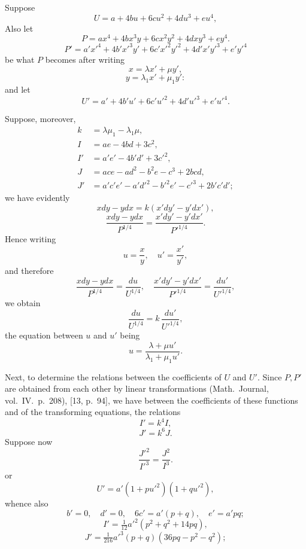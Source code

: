 \documentclass[11pt]{article}
\begin{document}
Suppose
\[
U = a + 4bu + 6cu^2 + 4du^3 + eu^4,
\]
Also let
\[
P = ax^4 + 4bx^3 y + 6cx^2 y^2 + 4dxy^3 + ey^4.
\]
\[
P' = a'x'^4 + 4b'x'^3 y' + 6c'x'^2 y'^2 + 4d'x'y'^3 + e'y'^4
\]
be what $P$ becomes after writing
\[
x = \lambda x' + \mu y',
\]
\[
y = \lambda_1 x' + \mu_1 y':
\]
and let
\[
U' = a' + 4b'u' + 6c'u'^2 + 4d'u'^3 + e'u'^4.
\]

\newpage
\setcounter{page}{225}

Suppose, moreover,
\begin{align*}
k &= \lambda\mu_1 - \lambda_1\mu,\\
I &= ae - 4bd + 3c^2,\\
I' &= a'e' - 4b'd' + 3c'^2,\\
J &= ace - ad^2 - b^2 e - c^3 + 2bcd,\\
J' &= a'c'e' - a'd'^2 - b'^2 e' - c'^3 + 2b'c'd';
\end{align*}
we have evidently
\[
xdy - ydx = k(x'dy' - y'dx'),
\]
\[
\frac{xdy - ydx}{P^{1/4}} = \frac{x'dy' - y'dx'}{P'^{1/4}}.
\]
Hence writing
\[
u = \frac{x}{y},\quad u' = \frac{x'}{y'},
\]
and therefore
\[
\frac{xdy - ydx}{P^{1/4}} = \frac{du}{U^{1/4}},\quad \frac{x'dy' - y'dx'}{P'^{1/4}} = \frac{du'}{U'^{1/4}},
\]
we obtain
\[
\frac{du}{U^{1/4}} = k\,\frac{du'}{U'^{1/4}},
\]
the equation between $u$ and $u'$ being
\[
u = \frac{\lambda + \mu u'}{\lambda_1 + \mu_1 u'}.
\]

Next, to determine the relations between the coefficients of $U$ and $U'$. Since $P, P'$ are obtained from each other by linear transformations (Math.~Journal, vol.~IV.~p.~208), [13, p.~94], we have between the coefficients of these functions and of the transforming equations, the relations
\[
I' = k^4 I,
\]
\[
J' = k^6 J.
\]
Suppose now
\[
\frac{J'^2}{I'^3} = \frac{J^2}{I^3}.
\]
or
\[
U' = a'(1 + pu'^2)(1 + qu'^2),
\]
whence also
\[
b' = 0,\quad d' = 0,\quad 6c' = a'(p + q),\quad e' = a'pq;
\]
\[
I' = \tfrac{1}{12} a'^2 (p^2 + q^2 + 14 pq),
\]
\[
J' = \tfrac{1}{216} a'^3 (p + q)(36 pq - p^2 - q^2);
\]

\newpage
\setcounter{page}{226}
\end{document}
